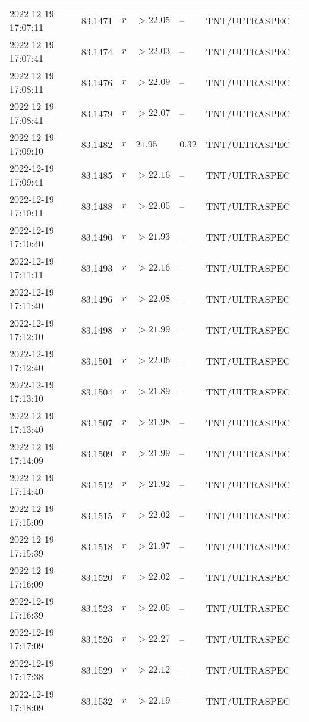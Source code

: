 \documentclass{nature_plusfigure}
\begin{document}
\begin{supplement}
\begin{center}
\begin{longtable}{lllllll}
2022-12-19 17:07:11 & 83.1471 & $r$ & $>22.05$ & -- & TNT/ULTRASPEC &  \\ 
2022-12-19 17:07:41 & 83.1474 & $r$ & $>22.03$ & -- & TNT/ULTRASPEC &  \\ 
2022-12-19 17:08:11 & 83.1476 & $r$ & $>22.09$ & -- & TNT/ULTRASPEC &  \\ 
2022-12-19 17:08:41 & 83.1479 & $r$ & $>22.07$ & -- & TNT/ULTRASPEC &  \\ 
2022-12-19 17:09:10 & 83.1482 & $r$ & $21.95$ & $0.32$ & TNT/ULTRASPEC &  \\ 
2022-12-19 17:09:41 & 83.1485 & $r$ & $>22.16$ & -- & TNT/ULTRASPEC &  \\ 
2022-12-19 17:10:11 & 83.1488 & $r$ & $>22.05$ & -- & TNT/ULTRASPEC &  \\ 
2022-12-19 17:10:40 & 83.1490 & $r$ & $>21.93$ & -- & TNT/ULTRASPEC &  \\ 
2022-12-19 17:11:11 & 83.1493 & $r$ & $>22.16$ & -- & TNT/ULTRASPEC &  \\ 
2022-12-19 17:11:40 & 83.1496 & $r$ & $>22.08$ & -- & TNT/ULTRASPEC &  \\ 
2022-12-19 17:12:10 & 83.1498 & $r$ & $>21.99$ & -- & TNT/ULTRASPEC &  \\ 
2022-12-19 17:12:40 & 83.1501 & $r$ & $>22.06$ & -- & TNT/ULTRASPEC &  \\ 
2022-12-19 17:13:10 & 83.1504 & $r$ & $>21.89$ & -- & TNT/ULTRASPEC &  \\ 
2022-12-19 17:13:40 & 83.1507 & $r$ & $>21.98$ & -- & TNT/ULTRASPEC &  \\ 
2022-12-19 17:14:09 & 83.1509 & $r$ & $>21.99$ & -- & TNT/ULTRASPEC &  \\ 
2022-12-19 17:14:40 & 83.1512 & $r$ & $>21.92$ & -- & TNT/ULTRASPEC &  \\ 
2022-12-19 17:15:09 & 83.1515 & $r$ & $>22.02$ & -- & TNT/ULTRASPEC &  \\ 
2022-12-19 17:15:39 & 83.1518 & $r$ & $>21.97$ & -- & TNT/ULTRASPEC &  \\ 
2022-12-19 17:16:09 & 83.1520 & $r$ & $>22.02$ & -- & TNT/ULTRASPEC &  \\ 
2022-12-19 17:16:39 & 83.1523 & $r$ & $>22.05$ & -- & TNT/ULTRASPEC &  \\ 
2022-12-19 17:17:09 & 83.1526 & $r$ & $>22.27$ & -- & TNT/ULTRASPEC &  \\ 
2022-12-19 17:17:38 & 83.1529 & $r$ & $>22.12$ & -- & TNT/ULTRASPEC &  \\ 
2022-12-19 17:18:09 & 83.1532 & $r$ & $>22.19$ & -- & TNT/ULTRASPEC &  \\ 

\end{longtable}
\end{center}
\end{supplement}
\end{document}
